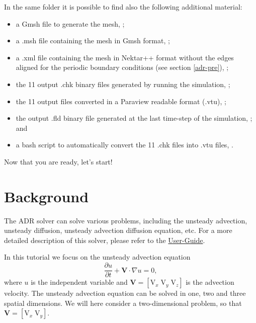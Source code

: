 In the same folder it is possible to find also the following additional material:
\vspace{-0.5cm}
\begin{itemize}
\item a Gmsh file to generate the mesh, ;
\item a .msh file containing the mesh in Gmsh format, ;
\item a .xml file containing the mesh in Nektar++ format without the edges aligned 
for the periodic boundary conditions (see section \ref{adr-pre}), ;
\item the 11 output .chk binary files generated by running the simulation, ;
\item the 11 output files converted in a Paraview readable format (.vtu),  ;
\item the output .fld binary file generated at the last time-step of the simulation, ; and
\item a bash script to automatically convert the 11 .chk files into .vtu files, .
\end{itemize}

\begin{center}
Now that you are ready, let's start!
\end{center}

\section{Background}
The ADR solver can solve various problems, including the unsteady advection, unsteady diffusion, 
unsteady advection diffusion equation, etc. For a more detailed description of this solver, please 
refer to the \href{http://www.nektar.info/downloads/8}{User-Guide}. 

In this tutorial we focus on the unsteady advection equation
\begin{equation}
\dfrac{\partial u}{\partial t} + \mathbf{V}\cdot\nabla u = 0,
\label{eq:advection}
\end{equation}
where $u$ is the independent variable and $\mathbf{V} = [\text{V}_{x}\; \text{V}_{y}\; \text{V}_{z}]$ 
is the advection velocity. The unsteady advection equation can be solved in one, two and three spatial 
dimensions. We will here consider a two-dimensional problem, so that $\mathbf{V} = [\text{V}_{x}\; \text{V}_{y}]$.

